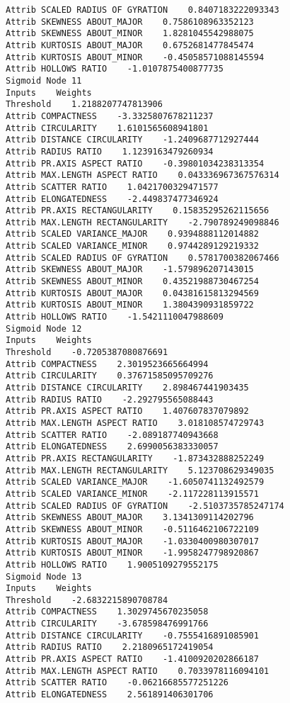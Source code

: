 \documentclass[
	article,			%
	11pt,				%
	oneside,			%
	a4paper,			%
	english,			%
	brazil,				%
	sumario=tradicional
	]{abntex2}
\begin{document}
\begin{lstlisting}
Attrib SCALED RADIUS OF GYRATION    0.8407183222093343
Attrib SKEWNESS ABOUT_MAJOR    0.7586108963352123
Attrib SKEWNESS ABOUT_MINOR    1.8281045542988075
Attrib KURTOSIS ABOUT_MAJOR    0.6752681477845474
Attrib KURTOSIS ABOUT_MINOR    -0.45058571088145594
Attrib HOLLOWS RATIO    -1.0107875400877735
Sigmoid Node 11
Inputs    Weights
Threshold    1.2188207747813906
Attrib COMPACTNESS    -3.3325807678211237
Attrib CIRCULARITY    1.6101565608941801
Attrib DISTANCE CIRCULARITY    -1.2409687712927444
Attrib RADIUS RATIO    1.1239163479260934
Attrib PR.AXIS ASPECT RATIO    -0.39801034238313354
Attrib MAX.LENGTH ASPECT RATIO    0.043336967367576314
Attrib SCATTER RATIO    1.0421700329471577
Attrib ELONGATEDNESS    -2.449837477346924
Attrib PR.AXIS RECTANGULARITY    0.15835295262115656
Attrib MAX.LENGTH RECTANGULARITY    -2.790789249098846
Attrib SCALED VARIANCE_MAJOR    0.9394888112014882
Attrib SCALED VARIANCE_MINOR    0.9744289129219332
Attrib SCALED RADIUS OF GYRATION    0.5781700382067466
Attrib SKEWNESS ABOUT_MAJOR    -1.579896207143015
Attrib SKEWNESS ABOUT_MINOR    0.43521988730467254
Attrib KURTOSIS ABOUT_MAJOR    0.04381615813294569
Attrib KURTOSIS ABOUT_MINOR    1.3804390931859722
Attrib HOLLOWS RATIO    -1.5421110047988609
Sigmoid Node 12
Inputs    Weights
Threshold    -0.7205387080876691
Attrib COMPACTNESS    2.3019523665664994
Attrib CIRCULARITY    0.37671585095709276
Attrib DISTANCE CIRCULARITY    2.898467441903435
Attrib RADIUS RATIO    -2.292795565088443
Attrib PR.AXIS ASPECT RATIO    1.407607837079892
Attrib MAX.LENGTH ASPECT RATIO    3.018108574729743
Attrib SCATTER RATIO    -2.089187740943668
Attrib ELONGATEDNESS    2.6990056383330057
Attrib PR.AXIS RECTANGULARITY    -1.873432888252249
Attrib MAX.LENGTH RECTANGULARITY    5.123708629349035
Attrib SCALED VARIANCE_MAJOR    -1.6050741132492579
Attrib SCALED VARIANCE_MINOR    -2.117228113915571
Attrib SCALED RADIUS OF GYRATION    -2.5103735785247174
Attrib SKEWNESS ABOUT_MAJOR    3.1341309114202796
Attrib SKEWNESS ABOUT_MINOR    -0.5116462106722109
Attrib KURTOSIS ABOUT_MAJOR    -1.0330400980307017
Attrib KURTOSIS ABOUT_MINOR    -1.9958247798920867
Attrib HOLLOWS RATIO    1.9005109279552175
Sigmoid Node 13
Inputs    Weights
Threshold    -2.6832215890708784
Attrib COMPACTNESS    1.3029745670235058
Attrib CIRCULARITY    -3.678598476991766
Attrib DISTANCE CIRCULARITY    -0.7555416891085901
Attrib RADIUS RATIO    2.2180965172419054
Attrib PR.AXIS ASPECT RATIO    -1.4100920202866187
Attrib MAX.LENGTH ASPECT RATIO    0.7033978116094101
Attrib SCATTER RATIO    -0.06216685577251226
Attrib ELONGATEDNESS    2.561891406301706

\end{lstlisting}
\end{document}
